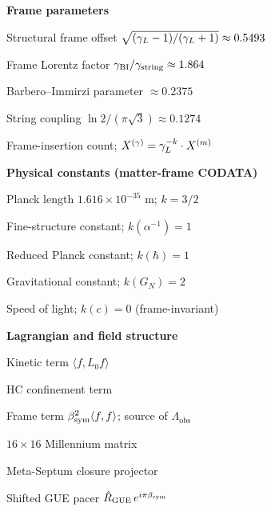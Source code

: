 \begin{minipage}[t]{0.48\textwidth}
\medskip
\noindent\textbf{Frame parameters}
\begin{description}[leftmargin=1.8em, labelindent=0pt, itemsep=1pt]
  \item[$\bsym$] Structural frame offset $\sqrt{(\gamma_L-1)/(\gamma_L+1)}\approx 0.5493$
  \item[$\gL$] Frame Lorentz factor $\gamma_{\mathrm{BI}}/\gamma_{\mathrm{string}}\approx 1.864$
  \item[$\gBI$] Barbero--Immirzi parameter $\approx 0.2375$
  \item[$\gstring$] String coupling $\ln 2/(\pi\sqrt{3})\approx 0.1274$
  \item[$k(X)$] Frame-insertion count; $X^{(\gamma)}=\gamma_L^{-k}\cdot X^{(m)}$
\end{description}
\end{minipage}
\hfill
\begin{minipage}[t]{0.48\textwidth}
\small
\noindent\textbf{Physical constants (matter-frame CODATA)}
\begin{description}[leftmargin=1.8em, labelindent=0pt, itemsep=1pt]
  \item[$\lP$] Planck length $1.616\times10^{-35}$ m; $k=3/2$
  \item[$\alpha$] Fine-structure constant; $k(\alpha^{-1})=1$
  \item[$\hbar$] Reduced Planck constant; $k(\hbar)=1$
  \item[$G_N$] Gravitational constant; $k(G_N)=2$
  \item[$c$] Speed of light; $k(c)=0$ (frame-invariant)
\end{description}

\medskip
\noindent\textbf{Lagrangian and field structure}
\begin{description}[leftmargin=1.8em, labelindent=0pt, itemsep=1pt]
  \item[$\mathcal{L}_{\mathrm{kin}}$] Kinetic term $\langle f,L_0 f\rangle$
  \item[$\mathcal{L}_{\mathrm{HC}}$] HC confinement term
  \item[$\mathcal{L}_{\mathrm{frame}}$] Frame term $\beta_{\mathrm{sym}}^2\langle f,f\rangle$; source of $\Lambda_{\mathrm{obs}}$
  \item[$\mathcal{M}_{16}$] $16\times16$ Millennium matrix
  \item[$\hat P_{C_7}$] Meta-Septum closure projector
  \item[$\hat{\mathcal{R}}_\beta$] Shifted GUE pacer $\hat R_{\mathrm{GUE}}\,e^{i\pi\beta_{\mathrm{sym}}}$
\end{description}


\end{minipage}
